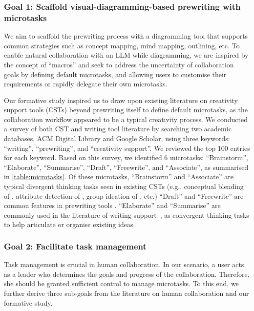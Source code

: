

\subsubsection*{\textbf{Goal 1: Scaffold visual-diagramming-based prewriting with microtasks}}
We aim to scaffold the prewriting process with a diagramming tool that supports common strategies such as concept mapping, mind mapping, outlining, etc. To enable natural collaboration with an LLM while diagramming, we are inspired by the concept of ``macros'' \cite{kurlander1992history} and seek to address the uncertainty of collaboration goals by defining default microtasks, and allowing users to customise their requirements or rapidly delegate their own microtasks.

Our formative study inspired us to draw upon existing literature on creativity support tools (CSTs) beyond prewriting itself to define default microtasks, as the collaboration workflow appeared to be a typical creativity process. We conducted a survey of both CST and writing tool literature by searching two academic databases, ACM Digital Library and Google Scholar, using three keywords: ``writing'', ``prewriting'', and ``creativity support''. We reviewed the top 100 entries for each keyword.
Based on this survey, we identified 6 microtasks: ``Brainstorm'', ``Elaborate'', ``Summarise'', ``Draft'', ``Freewrite'', and ``Associate'', as summarised in \autoref{table:microtasks}. Of these microtasks, ``Brainstorm'' and ``Associate'' are typical divergent thinking tasks seen in existing CSTs (e.g., conceptual blending of \cite{wang2021popblends,chilton2019visiblends}, attribute detection of \cite{jeon2021fashionq}, group ideation of \cite{teevan2016supporting,wang2010idea}, etc.)
``Draft'' and ``Freewrite'' are common features in prewriting tools \cite{lu2018inkplanner,sadauskas2015mining}. ``Elaborate'' and ``Summarise'' are commonly used in the literature of writing support~\cite{uto2015academic,dang2022beyond}, as convergent thinking tasks to help articulate or organise existing ideas.

\subsubsection*{\textbf{Goal 2: Facilitate task management}}
Task management is crucial in human collaboration. In our scenario, a user acts as a leader who determines the goals and progress of the collaboration. Therefore, she should be granted sufficient control to manage microtasks. To this end, we further derive three sub-goals from the literature on human collaboration and our formative study.
